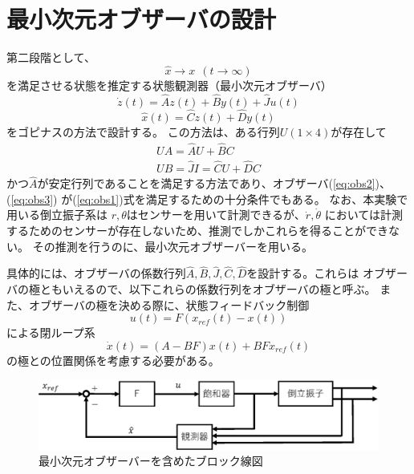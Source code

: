 \section{最小次元オブザーバの設計}
	第二段階として、
	\begin{equation}
		\hat{x}→x\ \ (t→\infty)
		\label{eq:obs1}
	\end{equation}
	を満足させる状態を推定する状態観測器（最小次元オブザーバ）
	\begin{equation}
		\dot{z}(t) = \hat{A}z(t)+\hat{B}y(t)+\hat{J}u(t)
		\label{eq:obs2}
	\end{equation}
	\begin{equation}
		\hat{x}(t) = \hat{C}z(t) + \hat{D}y(t)
		\label{eq:obs3}
	\end{equation}
	をゴピナスの方法で設計する。
	この方法は、ある行列$U(1×4)$が存在して
	\[
		\begin{array}{c}
			UA = \hat{A}U + \hat{B}C \\
			UB = \hat{J}
			I = \hat{C}U + \hat{D}C
		\end{array}
	\]
	かつ$\hat{A}$が安定行列であることを満足する方法であり、オブザーバ(\ref{eq:obs2})、(\ref{eq:obs3})
	が(\ref{eq:obs1})式を満足するための十分条件でもある。
	なお、本実験で用いる倒立振子系は
	$r,\theta$はセンサーを用いて計測できるが、$\dot{r},\dot{\theta}$
	においては計測するためのセンサーが存在しないため、推測でしかこれらを得ることができない。
	その推測を行うのに、最小次元オブザーバーを用いる。
	\par
	具体的には、オブザーバの係数行列$\hat{A},\hat{B},\hat{J},\hat{C},\hat{D}$を設計する。これらは
	オブザーバの極ともいえるので、以下これらの係数行列をオブザーバの極と呼ぶ。
	また、オブザーバの極を決める際に、状態フィードバック制御
	\[
		u(t) = F(x_{ref}(t)-x(t))
	\]
	による閉ループ系
	\[
		\dot{x}(t) = (A-BF)x(t) + BFx_{ref}(t)
	\]
	の極との位置関係を考慮する必要がある。
	\begin{figure}[h]
		\centering
		\includegraphics[width=0.8\linewidth]{gazo/controll_obs.eps}
		\caption{最小次元オブザーバーを含めたブロック線図}
		\label{image:cOBS}
	\end{figure}

